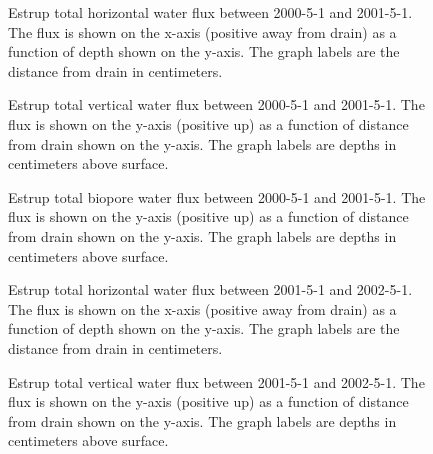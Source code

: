 \begin{figure}[htbp]
  \centering
  
  \caption{Estrup total horizontal water flux between 2000-5-1 and
    2001-5-1.  The flux is shown on the x-axis (positive away from
    drain) as a function of depth shown on the y-axis.  The graph
    labels are the distance from drain in centimeters.}
  \label{fig:Estrup-water-2000-horizontal}
\end{figure}\FloatBarrier

\begin{figure}[htbp]
  \centering
  
  \caption{Estrup total vertical water flux between 2000-5-1 and
    2001-5-1.  The flux is shown on the y-axis (positive up) as a
    function of distance from drain shown on the y-axis.  The graph
    labels are depths in centimeters above surface.}
  \label{fig:Estrup-water-2000}
\end{figure}\FloatBarrier

\begin{figure}[htbp]
  \centering
  
  \caption{Estrup total biopore water flux between 2000-5-1 and
    2001-5-1.  The flux is shown on the y-axis (positive up) as a
    function of distance from drain shown on the y-axis.  The graph
    labels are depths in centimeters above surface.}
  \label{fig:Estrup-water-biopore-2000}
\end{figure}\FloatBarrier

\begin{figure}[htbp]
  \centering
  
  \caption{Estrup total horizontal water flux between 2001-5-1 and
    2002-5-1.  The flux is shown on the x-axis (positive away from
    drain) as a function of depth shown on the y-axis.  The graph
    labels are the distance from drain in centimeters.}
  \label{fig:Estrup-water-2001-horizontal}
\end{figure}\FloatBarrier

\begin{figure}[htbp]
  \centering
  
  \caption{Estrup total vertical water flux between 2001-5-1 and
    2002-5-1.  The flux is shown on the y-axis (positive up) as a
    function of distance from drain shown on the y-axis.  The graph
    labels are depths in centimeters above surface.}
  \label{fig:Estrup-water-2001}
\end{figure}\FloatBarrier

